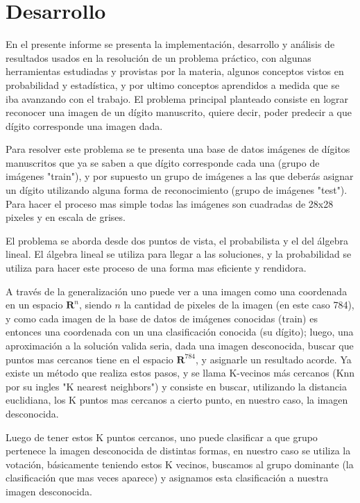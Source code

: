 \documentclass[a4paper]{article}
\begin{document}
\section{Desarrollo}
En el presente informe se presenta la implementación, desarrollo y análisis de resultados usados en la resolución de un problema práctico, con algunas herramientas estudiadas y provistas por la materia, algunos conceptos vistos en probabilidad y estadística, y por ultimo conceptos aprendidos a medida que se iba avanzando con el trabajo. El problema principal planteado consiste en lograr reconocer una imagen de un dígito manuscrito, quiere decir, poder predecir a que dígito corresponde una imagen dada.\par
Para resolver este problema se te presenta una base de datos imágenes de dígitos manuscritos que ya se saben a que dígito corresponde cada una (grupo de imágenes "train"), y por supuesto un grupo de imágenes a las que deberás asignar un dígito utilizando alguna forma de reconocimiento (grupo de imágenes "test"). Para hacer el proceso mas simple todas las imágenes son cuadradas de 28x28 pixeles y en escala de grises.\smallbreak\par
El problema se aborda desde dos puntos de vista, el probabilista y el del álgebra lineal. El álgebra lineal se utiliza para llegar a las soluciones, y la probabilidad se utiliza para hacer este proceso de una forma mas eficiente y rendidora.\smallbreak\par
A través de la generalización uno puede ver a una imagen como una coordenada en un espacio $\mathbf{R}^{n}$, siendo $n$ la cantidad de pixeles de la imagen (en este caso 784), y como cada imagen de la base de datos de imágenes conocidas (train) es entonces una coordenada con un una clasificación conocida (su dígito); luego, una aproximación a la solución valida seria, dada una imagen desconocida, buscar que puntos mas cercanos tiene en el espacio $\mathbf{R}^{784}$, y asignarle un resultado acorde.
Ya existe un método que realiza estos pasos, y se llama K-vecinos más cercanos (Knn por su ingles "K nearest neighbors") y consiste en buscar, utilizando la distancia euclidiana, los K puntos mas cercanos a cierto punto, en nuestro caso, la imagen desconocida.\par
Luego de tener estos K puntos cercanos, uno puede clasificar a que grupo pertenece la imagen desconocida de distintas formas, en nuestro caso se utiliza la votación, básicamente teniendo estos K vecinos, buscamos al grupo dominante (la clasificación que mas veces aparece) y asignamos esta clasificación a nuestra imagen desconocida.\smallbreak\par
\end{document}
